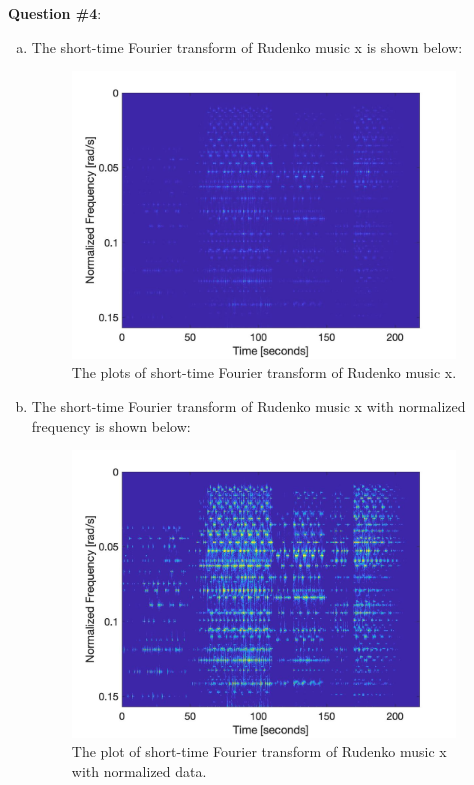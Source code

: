 \documentclass[a4paper]{article}
\begin{document}
\begin{spacing}{2.0}
\Large\textbf{Question \#4}:
\normalsize
\begin{enumerate}[(a)]
\item The short-time Fourier transform of Rudenko music x is shown below:
\begin{figure}[H]
\centering
\includegraphics[width=4in]{Q4parta.jpg}
\caption{The plots of short-time Fourier transform of Rudenko music x.}
\end{figure}

\item The short-time Fourier transform of Rudenko music x with normalized frequency is shown below:
\begin{figure}[H]
\centering
\includegraphics[width=4in]{Q4partb.jpg}
\caption{The plot of short-time Fourier transform of Rudenko music x with normalized data.}
\end{figure}


\end{enumerate}
\end{spacing}
\end{document}
